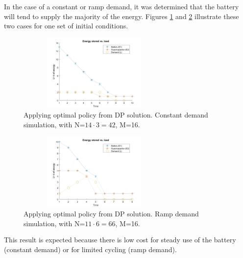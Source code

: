 \documentclass[conference]{IEEEtran}
\begin{document}
In the case of a constant or ramp demand, it was determined that the battery will tend to supply the majority of the energy. Figures \ref{fig:ConstDemand} and \ref{fig:RampDemand} illustrate these two cases for one set of initial conditions.
\begin{figure}[htbp]
\centerline{\includegraphics[width=3in,height=1.5in]{EnergyStoredvsload_ConstantLoad(E1_max=13,E2_max=2).jpg}}
\caption{Applying optimal policy from DP solution. Constant demand simulation, with N=$14\cdot3=42$, M=16.}
\label{fig:ConstDemand}
\end{figure}
\begin{figure}[htbp]
\centerline{\includegraphics[width=3in,height=1.5in]{EnergyStoredvsload_RampLoad(E1_max=10,E2_max=5).jpg}}
\caption{Applying optimal policy from DP solution. Ramp demand simulation, with N=$11\cdot6=66$, M=16.}
\label{fig:RampDemand}
\end{figure} This result is expected because there is low cost for steady use of the battery (constant demand) or for limited cycling (ramp demand).
\end{document}
